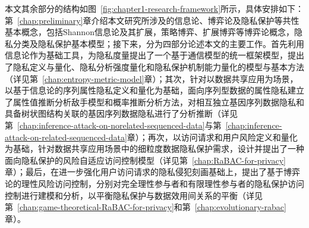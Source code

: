 本文其余部分的结构如图~\ref{fig:chapter1-research-framework}所示，具体安排如下：第~\ref{chap:preliminary}章介绍本文研究所涉及的信息论、博弈论及隐私保护等共性基本概念，包括Shannon信息论及其扩展，策略博弈、扩展博弈等博弈论概念，隐私分类及隐私保护基本模型；接下来，分为四部分论述本文的主要工作。首先利用信息论作为基础工具，为隐私度量提出了一个基于通信模型的统一框架模型，提出了隐私定义与量化、隐私分析强度量化和隐私保护机制能力量化的模型与基本方法（详见第~\ref{chap:entropy-metric-model}章）；其次，针对以数据共享应用为场景，以基于信息论的序列属性隐私定义和量化为基础，面向序列型数据的属性隐私建立了属性值推断分析敌手模型和概率推断分析方法，对相互独立基因序列数据隐私和具备树状图结构关联的基因序列数据隐私进行了分析推断（详见第~\ref{chap:inference-attack-on-norelated-sequenced-data}与第~\ref{chap:inference-attack-on-related-sequenced-data}章）；再次，以访问请求和用户风险定义和量化为基础，针对数据共享应用场景中的细粒度数据隐私保护需求，设计并提出了一种面向隐私保护的风险自适应访问控制模型（详见第~\ref{chap:RaBAC-for-privacy}章）；最后，在进一步强化用户访问请求的隐私侵犯刻画基础上，提出了基于博弈论的理性风险访问控制，分别对完全理性参与者和有限理性参与者的隐私保护访问控制进行建模和分析，以平衡隐私保护与数据效用间关系的平衡（详见第~\ref{chap:game-theoretical-RaBAC-for-privacy}和第~\ref{chap:evolutionary-rabac}章）。
